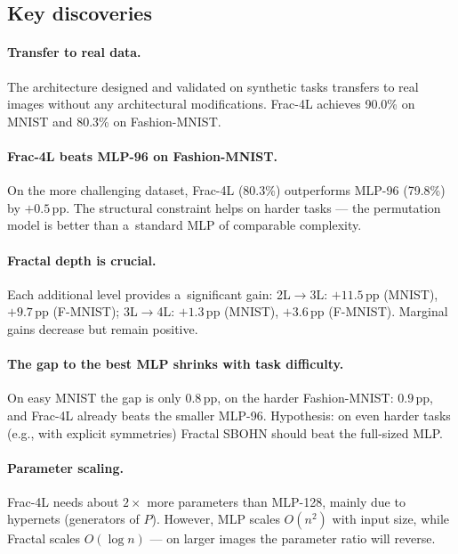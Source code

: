 \documentclass[11pt,a4paper]{report}
\begin{document}
\subsection{Key discoveries}

\paragraph{Transfer to real data.}
The architecture designed and validated on synthetic tasks transfers to real images
without any architectural modifications. Frac-4L achieves 90.0\% on MNIST and 80.3\% on Fashion-MNIST.

\paragraph{Frac-4L beats MLP-96 on Fashion-MNIST.}
On the more challenging dataset, Frac-4L (80.3\%) outperforms MLP-96 (79.8\%) by $+0.5$\,pp.
The structural constraint helps on harder tasks --- the permutation model
is better than a~standard MLP of comparable complexity.

\paragraph{Fractal depth is crucial.}
Each additional level provides a~significant gain:
2L$\to$3L: $+11.5$\,pp (MNIST), $+9.7$\,pp (F-MNIST);
3L$\to$4L: $+1.3$\,pp (MNIST), $+3.6$\,pp (F-MNIST).
Marginal gains decrease but remain positive.

\paragraph{The gap to the best MLP shrinks with task difficulty.}
On easy MNIST the gap is only $0.8$\,pp, on the harder Fashion-MNIST: $0.9$\,pp,
and Frac-4L already beats the smaller MLP-96. Hypothesis: on even harder tasks
(e.g., with explicit symmetries) Fractal SBOHN should beat the full-sized MLP.

\paragraph{Parameter scaling.}
Frac-4L needs about $2\times$ more parameters than MLP-128, mainly due to hypernets
(generators of $P$). However, MLP scales $O(n^2)$ with input size, while Fractal scales $O(\log n)$
--- on larger images the parameter ratio will reverse.



\clearpage
\end{document}
